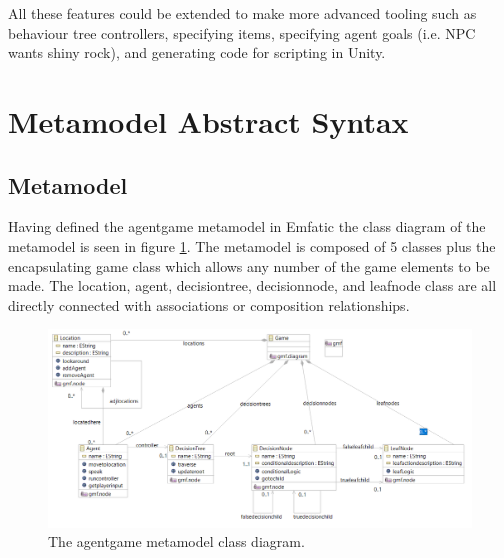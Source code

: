 \documentclass[letterpaper,12pt]{article}  %
\begin{document}
All these features could be extended to make more advanced tooling such as behaviour tree controllers, specifying items, specifying agent goals (i.e. NPC wants shiny rock), and generating code for scripting in Unity.



\section{Metamodel Abstract Syntax}
\subsection{Metamodel}
Having defined the agentgame metamodel in Emfatic the class diagram of the metamodel is seen in figure \ref{fig:metamodel}. The metamodel is composed of 5 classes plus the encapsulating game class which allows any number of the game elements to be made. The location, agent, decisiontree, decisionnode, and leafnode class are all directly connected with associations or composition relationships.

\begin{figure}[h]  %
    \centering  %
    \includegraphics[width = 16 cm ]{Agentgame MetaModel Class Diagram.png}
    \caption{The agentgame metamodel class diagram.}
    \label{fig:metamodel}
\end{figure}
\end{document}
